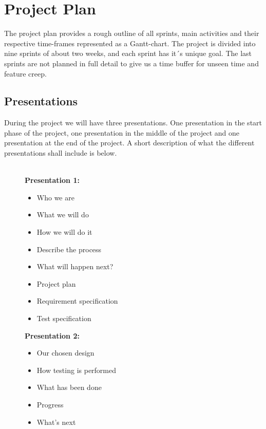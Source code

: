 \section{Project Plan}

The project plan provides a rough outline of all sprints, main activities and their respective time-frames represented as a Gantt-chart. The project is divided into nine sprints of about two weeks, and each sprint has it´s unique goal. The last sprints are not planned in full detail to give us a time buffer for unseen time and feature creep.

\subsection{Presentations}
During the project we will have three presentations. One presentation in the start phase of the project, one presentation in the middle of the project and one presentation at the end of the project. A short description of what the different presentations shall include is below. \\\\
\begin{figure}[h]
\begin{minipage}[t]{0.5\textwidth}
\textbf{Presentation 1:}
\begin{itemize}
  \item Who we are
  \item What we will do
  \item How we will do it
  \item Describe the process 
  \item What will happen next? 
  \item Project plan
  \item Requirement specification
  \item Test specification 
\end{itemize}
\end{minipage}
\hfill
\begin{minipage}[t]{0.5\textwidth}
\textbf{Presentation 2:}
\begin{itemize}
  \item Our chosen design
  \item How testing is performed
  \item What has been done
  \item Progress 
  \item What's next
\end{itemize}
\end{minipage}
\hfill
\end{figure}\\
